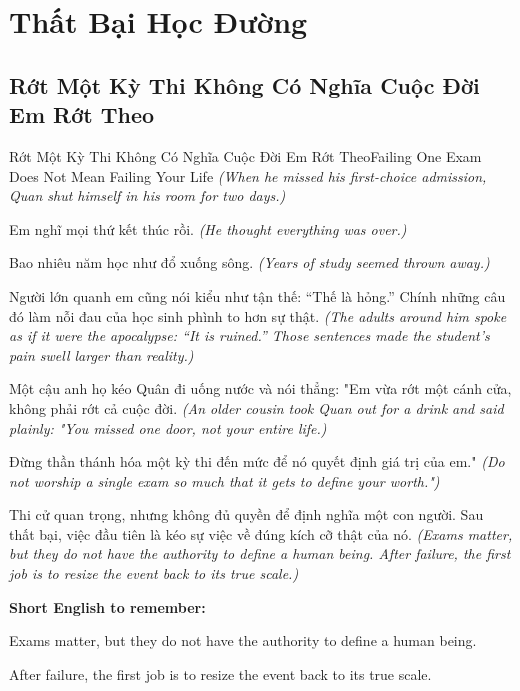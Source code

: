 \chapter{Thất Bại Học Đường}

\section{Rớt Một Kỳ Thi Không Có Nghĩa Cuộc Đời Em Rớt Theo}
\begin{truyen}{Rớt Một Kỳ Thi Không Có Nghĩa Cuộc Đời Em Rớt Theo}{Failing One Exam Does Not Mean Failing Your Life}
\textit{(When he missed his first-choice admission, Quan shut himself in his room for two days.)}

Em nghĩ mọi thứ kết thúc rồi.
\textit{(He thought everything was over.)}

Bao nhiêu năm học như đổ xuống sông.
\textit{(Years of study seemed thrown away.)}

Người lớn quanh em cũng nói kiểu như tận thế: ``Thế là hỏng.'' Chính những câu đó làm nỗi đau của học sinh phình to hơn sự thật.
\textit{(The adults around him spoke as if it were the apocalypse: ``It is ruined.'' Those sentences made the student’s pain swell larger than reality.)}

Một cậu anh họ kéo Quân đi uống nước và nói thẳng: "Em vừa rớt một cánh cửa, không phải rớt cả cuộc đời.
\textit{(An older cousin took Quan out for a drink and said plainly: "You missed one door, not your entire life.)}

Đừng thần thánh hóa một kỳ thi đến mức để nó quyết định giá trị của em."
\textit{(Do not worship a single exam so much that it gets to define your worth.")}

\end{truyen}

\begin{baihoc}
Thi cử quan trọng, nhưng không đủ quyền để định nghĩa một con người. Sau thất bại, việc đầu tiên là kéo sự việc về đúng kích cỡ thật của nó.
\textit{(Exams matter, but they do not have the authority to define a human being. After failure, the first job is to resize the event back to its true scale.)}
\end{baihoc}

\begin{ghinhoanh}
\textbf{Short English to remember:}

Exams matter, but they do not have the authority to define a human being.

After failure, the first job is to resize the event back to its true scale.

\end{ghinhoanh}

